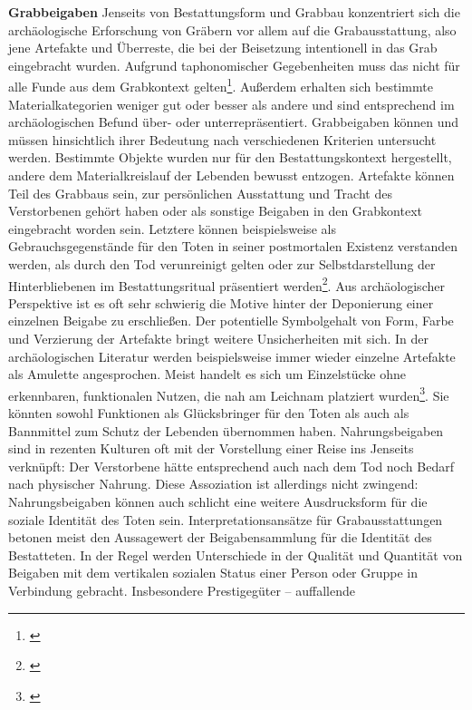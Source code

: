 \documentclass[openany,twoside,twocolumn]{book}
\let\rmarkdownfootnote\footnote%
\def\footnote{\protect\rmarkdownfootnote}
\begin{document}
\textbf{Grabbeigaben} \newline  Jenseits von Bestattungsform und Grabbau
konzentriert sich die archäologische Erforschung von Gräbern vor allem
auf die Grabausstattung, also jene Artefakte und Überreste, die bei der
Beisetzung intentionell in das Grab eingebracht wurden. Aufgrund
taphonomischer Gegebenheiten muss das nicht für alle Funde aus dem
Grabkontext gelten\footnote{\textcite{ravn_use_2000}}. Außerdem erhalten
sich bestimmte Materialkategorien weniger gut oder besser als andere und
sind entsprechend im archäologischen Befund über- oder
unterrepräsentiert. Grabbeigaben können und müssen hinsichtlich ihrer
Bedeutung nach verschiedenen Kriterien untersucht werden. Bestimmte
Objekte wurden nur für den Bestattungskontext hergestellt, andere dem
Materialkreislauf der Lebenden bewusst entzogen. Artefakte können Teil
des Grabbaus sein, zur persönlichen Ausstattung und Tracht des
Verstorbenen gehört haben oder als sonstige Beigaben in den Grabkontext
eingebracht worden sein. Letztere können beispielsweise als
Gebrauchsgegenstände für den Toten in seiner postmortalen Existenz
verstanden werden, als durch den Tod verunreinigt gelten oder zur
Selbstdarstellung der Hinterbliebenen im Bestattungsritual präsentiert
werden\footnote{\textcite{harke_beigabensitte_2003}}. Aus
archäologischer Perspektive ist es oft sehr schwierig die Motive hinter
der Deponierung einer einzelnen Beigabe zu erschließen. Der potentielle
Symbolgehalt von Form, Farbe und Verzierung der Artefakte bringt weitere
Unsicherheiten mit sich. In der archäologischen Literatur werden
beispielsweise immer wieder einzelne Artefakte als Amulette
angesprochen. Meist handelt es sich um Einzelstücke ohne erkennbaren,
funktionalen Nutzen, die nah am Leichnam platziert wurden\footnote{\textcite{thrane_stichwort_1973}}.
Sie könnten sowohl Funktionen als Glücksbringer für den Toten als auch
als Bannmittel zum Schutz der Lebenden übernommen haben.
Nahrungsbeigaben sind in rezenten Kulturen oft mit der Vorstellung einer
Reise ins Jenseits verknüpft: Der Verstorbene hätte entsprechend auch
nach dem Tod noch Bedarf nach physischer Nahrung. Diese Assoziation ist
allerdings nicht zwingend: Nahrungsbeigaben können auch schlicht eine
weitere Ausdrucksform für die soziale Identität des Toten sein.
Interpretationsansätze für Grabausstattungen betonen meist den
Aussagewert der Beigabensammlung für die Identität des Bestatteten. In
der Regel werden Unterschiede in der Qualität und Quantität von Beigaben
mit dem vertikalen sozialen Status einer Person oder Gruppe in
Verbindung gebracht. Insbesondere Prestigegüter -- auffallende
\end{document}
